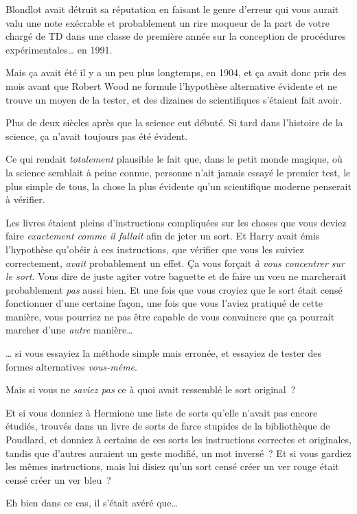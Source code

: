 Blondlot avait détruit sa réputation en faisant le genre d'erreur qui vous aurait valu une note exécrable et probablement un rire moqueur de la part de votre chargé de TD dans une classe de première année sur la conception de procédures expérimentales… en 1991.

Mais ça avait été il y a un peu plus longtemps, en 1904, et ça avait donc pris des mois avant que Robert Wood ne formule l'hypothèse alternative évidente et ne trouve un moyen de la tester, et des dizaines de scientifiques s'étaient fait avoir.

Plus de deux siècles après que la science eut débuté. Si tard dans l'histoire de la science, ça n'avait toujours pas été évident.

Ce qui rendait \emph{totalement} plausible le fait que, dans le petit monde magique, où la science semblait à peine connue, personne n'ait jamais essayé le premier test, le plus simple de tous, la chose la plus évidente qu'un scientifique moderne penserait à vérifier.

Les livres étaient pleins d'instructions compliquées sur les choses que vous deviez faire \emph{exactement comme il fallait} afin de jeter un sort. Et Harry avait émis l'hypothèse qu'obéir à ces instructions, que vérifier que vous les suiviez correctement, \emph{avait} probablement un effet. Ça vous forçait \emph{à vous concentrer sur le sort}. Vous dire de juste agiter votre baguette et de faire un vœu ne marcherait probablement \emph{pas} aussi bien. Et une fois que vous croyiez que le sort était censé fonctionner d'une certaine façon, une fois que vous l'aviez pratiqué de cette manière, vous pourriez ne pas être capable de vous convaincre que ça pourrait marcher d'une \emph{autre} manière…

… si vous essayiez la méthode simple mais erronée, et essayiez de tester des formes alternatives \emph{vous-même}.

Mais si vous ne \emph{saviez pas} ce à quoi avait ressemblé le sort original~?

Et si vous donniez à Hermione une liste de sorts qu'elle n'avait pas encore étudiés, trouvés dans un livre de sorts de farce stupides de la bibliothèque de Poudlard, et donniez à certains de ces sorts les instructions correctes et originales, tandis que d'autres auraient un geste modifié, un mot inversé~? Et si vous gardiez les mêmes instructions, mais lui disiez qu'un sort censé créer un ver rouge était censé créer un ver bleu~?

Eh bien dans ce cas, il s'était avéré que…


